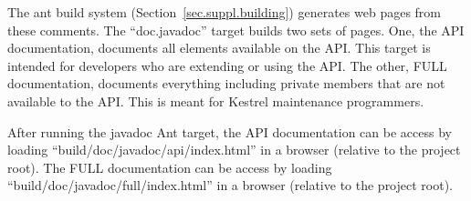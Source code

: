 The ant build system (Section~\ref{sec.suppl.building}) generates web pages from these comments. The ``doc.javadoc'' target builds two sets of pages. One, the API documentation, documents all elements available on the API. This target is intended for developers who are extending or using the API. The other, FULL documentation, documents everything including private members that are not available to the API. This is meant for Kestrel maintenance programmers.

After running the javadoc Ant target, the API documentation can be access by loading ``build/doc/javadoc/api/index.html'' in a browser (relative to the project root). The FULL documentation can be access by loading ``build/doc/javadoc/full/index.html'' in a browser (relative to the project root).

